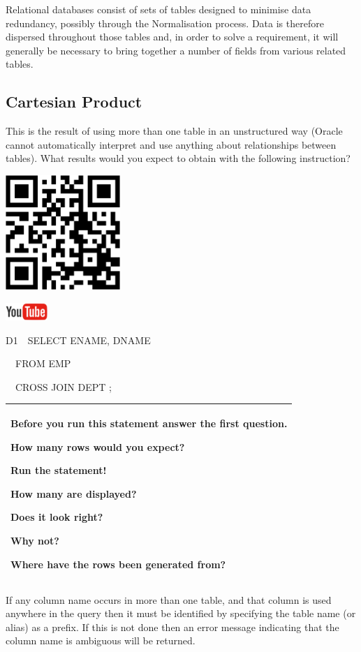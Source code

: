 Relational databases consist of sets of tables designed to minimise data redundancy, possibly through the Normalisation process.  Data is therefore dispersed throughout those tables and, in order to solve a requirement, it will generally be necessary to bring together a number of fields from various related tables.  

\subsection{Cartesian Product}
This is the result of using more than one table in an unstructured way (Oracle cannot automatically interpret and use anything about relationships between tables).  What results would you expect to obtain with the following  instruction?



\begin{center}
\begin{minipage}{4.849cm}
   
\includegraphics[width=4.341cm,height=4.341cm]{images/img (36).png}
 

   
\includegraphics[width=1.582cm,height=0.674cm]{images/img (15).png}
 
\end{minipage}
\end{center}
D1\ \ SELECT ENAME, DNAME 

\ \ FROM EMP

\ \ CROSS JOIN DEPT ;

\begin{flushleft}
\tablefirsthead{}
\tablehead{}
\tabletail{}
\tablelasttail{}
\begin{supertabular}{|m{9.911cm}|}
\hline
Before you run this statement answer the first question.

How many rows would you expect?

Run the statement!

How many are displayed?

Does it look right?

Why not?

Where have the rows been generated from?\\\hline
\end{supertabular}
\end{flushleft}
If any column name occurs in more than one table, and that column is used anywhere in the query then it must be identified by specifying the table name (or alias) as a prefix.  If this is not done then an error message indicating that the column name is ambiguous will be returned. 

